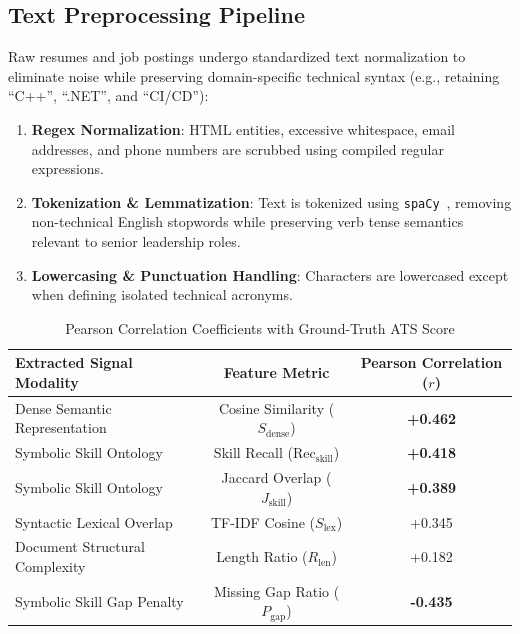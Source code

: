 \documentclass[conference]{IEEEtran}
\begin{document}
\subsection{Text Preprocessing Pipeline}
Raw resumes and job postings undergo standardized text normalization to eliminate noise while preserving domain-specific technical syntax (e.g., retaining ``C++'', ``.NET'', and ``CI/CD''):
\begin{enumerate}
    \item \textbf{Regex Normalization}: HTML entities, excessive whitespace, email addresses, and phone numbers are scrubbed using compiled regular expressions.
    \item \textbf{Tokenization \& Lemmatization}: Text is tokenized using \texttt{spaCy}~\cite{spacy2020}, removing non-technical English stopwords while preserving verb tense semantics relevant to senior leadership roles.
    \item \textbf{Lowercasing \& Punctuation Handling}: Characters are lowercased except when defining isolated technical acronyms.
\end{enumerate}

\begin{table}[htbp]
\centering
\caption{Pearson Correlation Coefficients with Ground-Truth ATS Score}
\label{tab:correlation}
\begin{tabular}{lcc}
\toprule
\textbf{Extracted Signal Modality} & \textbf{Feature Metric} & \textbf{Pearson Correlation ($r$)} \\
\midrule
Dense Semantic Representation      & Cosine Similarity ($S_{\text{dense}}$) & \textbf{+0.462} \\
Symbolic Skill Ontology            & Skill Recall ($\text{Rec}_{\text{skill}}$) & \textbf{+0.418} \\
Symbolic Skill Ontology            & Jaccard Overlap ($J_{\text{skill}}$)     & \textbf{+0.389} \\
Syntactic Lexical Overlap          & TF-IDF Cosine ($S_{\text{lex}}$)         & +0.345 \\
Document Structural Complexity     & Length Ratio ($R_{\text{len}}$)          & +0.182 \\
Symbolic Skill Gap Penalty         & Missing Gap Ratio ($P_{\text{gap}}$)     & \textbf{-0.435} \\
\bottomrule
\end{tabular}
\end{table}

\end{document}
